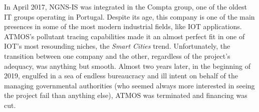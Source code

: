 In April 2017, NGNS-IS was integrated in the Compta group, one of the
oldest IT groups operating in Portugal. Despite its age, this company is
one of the main presences in some of the most modern industrial fields,
like \gls{IOT} applications. \gls{ATMOS}'s pollutant tracing
capabilities made it an almost perfect fit in one of \gls{IOT}'s most
resounding niches, the \emph{Smart Cities} trend. Unfortunately, the
transition between one company and the other, regardless of the
project's adequacy, was anything but smooth. Almost two years later, in
the beginning of 2019, engulfed in a sea of endless bureaucracy and ill
intent on behalf of the managing governmental authorities (who seemed
always more interested in seeing the project fail than anything else),
\gls{ATMOS} was terminated and financing was cut.

